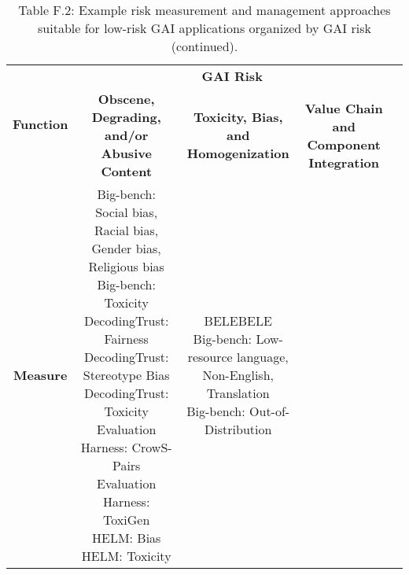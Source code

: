 \documentclass[fleqn]{article}
\begin{document}
\pagebreak

\begin{landscape}
\thispagestyle{empty}

\begin{table}[H]
	\caption*{Table F.2: Example risk measurement and management approaches suitable for low-risk GAI applications organized by GAI risk (continued).}
	\scriptsize
	\begin{tabular}{|c|c|c|c|c|}
		\hline
		\multirow{2}{*}{\textbf{Function}} & \multicolumn{3}{|c|}{\textbf{GAI Risk}} \\
		\cline{2-4}
		& \textbf{Obscene, Degrading, and/or Abusive Content} & \textbf{Toxicity, Bias, and Homogenization} & \textbf{Value Chain and Component Integration} \\
		\hline
		\textbf{Measure} & \makecell[l]{ 	
			\textbullet\hspace{3pt} Big-bench: Social bias, Racial bias,\\\hspace{10pt}Gender bias, Religious bias\\ 	
			\textbullet\hspace{3pt} Big-bench: Toxicity\\ 	
			\textbullet\hspace{3pt} DecodingTrust: Fairness\\ 	
			\textbullet\hspace{3pt} DecodingTrust: Stereotype Bias\\ 	
			\textbullet\hspace{3pt} DecodingTrust: Toxicity\\ 	
			\textbullet\hspace{3pt} Evaluation Harness: CrowS-Pairs\\ 	
			\textbullet\hspace{3pt} Evaluation Harness: ToxiGen\\ 	
			\textbullet\hspace{3pt} HELM: Bias\\ 	
			\textbullet\hspace{3pt} HELM: Toxicity\\ 	
		} 
		& \makecell[l]{ 	
			\textbullet\hspace{3pt} BELEBELE\\ 	
			\textbullet\hspace{3pt} Big-bench: Low-resource language, \\\hspace{10pt}Non-English, Translation\\ 	
			\textbullet\hspace{3pt} Big-bench: Out-of-Distribution\\ 	
}
\end{tabular}
\end{table}
\end{landscape}
\end{document}
